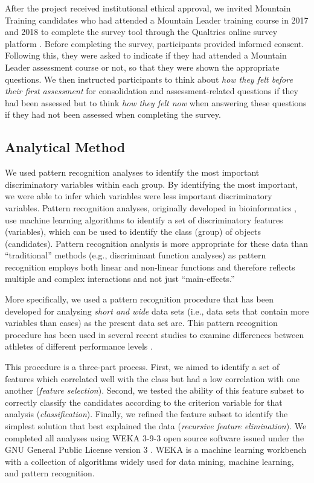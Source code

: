 \documentclass[
  12pt,
  a4paper,
]{book}
\begin{document}
After the project received institutional ethical approval, we invited Mountain Training candidates who had attended a Mountain Leader training course in 2017 and 2018 to complete the survey tool through the Qualtrics online survey platform \citep{Qualtrics}. Before completing the survey, participants provided informed consent. Following this, they were asked to indicate if they had attended a Mountain Leader assessment course or not, so that they were shown the appropriate questions. We then instructed participants to think about \emph{how they felt before their first assessment} for consolidation and assessment-related questions if they had been assessed but to think \emph{how they felt now} when answering these questions if they had not been assessed when completing the survey.

\hypertarget{pra-analytical-method}{%
\subsection{Analytical Method}\label{pra-analytical-method}}

We used pattern recognition analyses to identify the most important discriminatory variables within each group. By identifying the most important, we were able to infer which variables were less important discriminatory variables. Pattern recognition analyses, originally developed in bioinformatics \citep{Duda2000}, use machine learning algorithms to identify a set of discriminatory features (variables), which can be used to identify the class (group) of objects (candidates). Pattern recognition analysis is more appropriate for these data than ``traditional'' methods (e.g., discriminant function analyses) as pattern recognition employs both linear and non-linear functions and therefore reflects multiple and complex interactions and not just ``main-effects.''

More specifically, we used a pattern recognition procedure that has been developed for analysing \emph{short and wide} data sets (i.e., data sets that contain more variables than cases) as the present data set are. This pattern recognition procedure has been used in several recent studies to examine differences between athletes of different performance levels \citep[e.g.,][]{Gullich2019, Jones2019a, Jones2019b, Jones2020}.

This procedure is a three-part process. First, we aimed to identify a set of features which correlated well with the class but had a low correlation with one another (\emph{feature selection}). Second, we tested the ability of this feature subset to correctly classify the candidates according to the criterion variable for that analysis (\emph{classification}). Finally, we refined the feature subset to identify the simplest solution that best explained the data (\emph{recursive feature elimination}). We completed all analyses using WEKA 3-9-3 open source software issued under the GNU General Public License version 3 \citep{Bouckaert2018, Frank2016}. WEKA is a machine learning workbench with a collection of algorithms widely used for data mining, machine learning, and pattern recognition.
\end{document}
